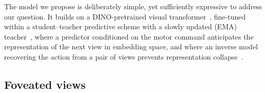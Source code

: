 \documentclass{article}
\begin{document}
The model we propose is deliberately simple, yet sufficiently expressive to address our question.
It builds on a DINO-pretrained visual transformer~\cite{caron2021emerging,oquab2024dinov2}, fine-tuned within a student--teacher predictive scheme with a slowly updated (EMA) teacher~\cite{grill2020bootstrap}, where a predictor conditioned on the motor command anticipates the representation of the next view in embedding space, and where an inverse model recovering the action from a pair of views prevents representation collapse~\cite{agrawal2015learning,pathak2017curiosity}.

\subsection{Foveated views}\label{sec:views}
\end{document}
